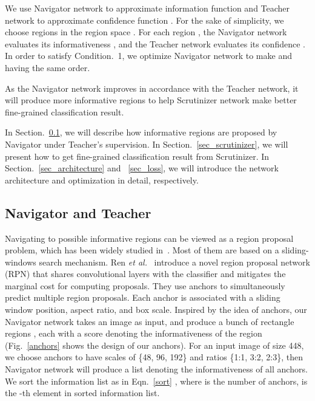 \documentclass[runningheads]{llncs}
\begin{document}
We use Navigator network to approximate information function  and Teacher network to approximate confidence function . For the sake of simplicity, we choose  regions  in the region space . For each region , the Navigator network evaluates its informativeness , and the Teacher network evaluates its confidence
 . In order to satisfy Condition.~1, we optimize Navigator network to make  and  having the same order. 

As the Navigator network improves in accordance with the Teacher network, it will produce more informative regions to help Scrutinizer network make better fine-grained classification result.

In Section.~\ref{sec_navigator_teacher}, we will describe how informative regions are proposed by Navigator under Teacher's supervision. In Section.~\ref{sec_scrutinizer},  we will present how to get fine-grained classification result from Scrutinizer. In Section.~\ref{sec_architecture} and ~\ref{sec_loss}, we will introduce the network architecture and optimization in detail, respectively.

\subsection{Navigator and Teacher}\label{sec_navigator_teacher}
Navigating to possible informative regions can be viewed as a region proposal problem, which has been widely studied in~\cite{Uijlings2013Selective,Endres2010Category,Arbelaez2014Multiscale,Carreira2012CPMC,NIPS2016_6532}. Most of them are based on a sliding-windows search mechanism. Ren \emph{et al.}~\cite{ren2015faster} introduce a novel region proposal network (RPN) that shares convolutional layers with the classifier and mitigates the marginal cost for computing proposals. They use anchors to simultaneously predict multiple region proposals. Each anchor is associated with a sliding window position, aspect ratio, and box scale. Inspired by the idea of anchors, our Navigator network takes an image as input, and produce a bunch of rectangle regions , each with a score denoting the informativeness of the region (Fig.~\ref{anchors} shows the design of our anchors). For an input image  of size 448, we choose anchors to have scales of \{48, 96, 192\} and ratios \{1:1, 3:2, 2:3\}, then Navigator network will produce a list denoting the informativeness of all anchors. We sort the information list as in Eqn.~\ref{sort} , where  is the number of anchors,  is the -th element in sorted information list.
\end{document}
